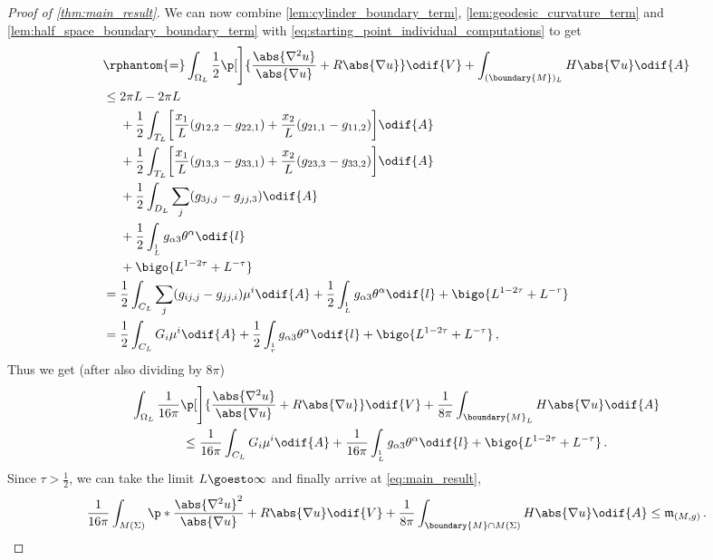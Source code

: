 \documentclass[titlepage,numbers=noenddot,oneside,%
cleardoublepage=empty,paper=a4,fontsize=11pt,%
english,%
]{scrartcl}
\newcommand*{\mathcomma}{\,,}
\newcommand*{\mathfullstop}{\,.}
\let\sphere\relax
\newcommand{\sphere}{\mathbb{S}}
\newcommand{\mass}[2]{\mathfrak{m}_{(#1,#2)}} %
\begin{document}
\begin{proof}[Proof of \cref{thm:main_result}]
    We can now combine \cref{lem:cylinder_boundary_term}, \cref{lem:geodesic_curvature_term} and \cref{lem:half_space_boundary_boundary_term} with \cref{eq:starting_point_individual_computations}
     to get
    \begin{equation*}
        \begin{aligned}[t]
            &\rphantom{=}\int_{\Omega_L} \frac{1}{2}\p[\Bigg]{\frac{\abs{\nabla^2 u}}{\abs{\nabla u}}+R\abs{\nabla u} }\odif{V}+\int_{(\boundary{M})_L} H\abs{\nabla u}\odif{A}\\
            & \leq \begin{aligned}[t]
                &2\pi L- 2\pi L\\
                &+\frac{1}{2}\int_{T_L}\biggl[\frac{x_1}{L}(g_{12,2}-g_{22,1})+\frac{x_2}{L}(g_{21,1}-g_{11,2})\biggr]\odif{A}\\
                &+\frac{1}{2}\int_{T_L}\biggl[\frac{x_1}{L}(g_{13,3}-g_{33,1})+\frac{x_2}{L}(g_{23,3}-g_{33,2})\biggr]\odif{A}\\
                &+\frac{1}{2}\int_{D_L}\sum_{j}(g_{3j,j}-g_{jj,3})\odif{A}\\
                &
                +\frac{1}{2}\int_{\sphere^1_L}g_{\alpha 3}\theta^\alpha\odif{l}\\
                &+\bigo{L^{1-2\tau}+L^{-\tau}}
            \end{aligned}\\
            &=\frac{1}{2}\int_{C_L}\sum_{j}(g_{ij,j}-g_{jj,i})\mu^i\odif{A}+\frac{1}{2}\int_{\sphere^1_L}g_{\alpha 3}\theta^\alpha\odif{l}+\bigo{L^{1-2\tau}+L^{-\tau}}\\
            &=\frac{1}{2}\int_{C_L}G_i\mu^i\odif{A}+\frac{1}{2}\int_{\sphere_r^{1}}g_{\alpha 3}\theta^\alpha\odif{l}+\bigo{L^{1-2\tau}+L^{-\tau}}\mathcomma
        \end{aligned}
    \end{equation*}
    Thus we get (after also dividing by \( 8\pi \))
    \begin{multline*}
        \int_{\Omega_L} \frac{1}{16\pi}\p[\Bigg]{\frac{\abs{\nabla^2 u}}{\abs{\nabla u}}+R \abs{\nabla u}}\odif{V}+\frac{1}{8\pi}\int_{\boundary{M}_L}H\abs{\nabla u}\odif{A}\\
        \leq \frac{1}{16\pi}\int_{C_L}G_i\mu^i\odif{A}+\frac{1}{16\pi}\int_{\sphere^1_L}g_{\alpha3}\theta^\alpha\odif{l}+\bigo{L^{1-2\tau}+L^{-\tau}}\mathfullstop
    \end{multline*}
    Since \( \tau>\frac{1}{2} \), we can take the limit \( L\goesto \infty \) and finally arrive at \cref{eq:main_result},
    \begin{equation}
        \frac{1}{16\pi}\int_{M(\Sigma)}\p*{\frac{\abs{\nabla^2 u}^2}{\abs{\nabla u}}+R\abs{\nabla u}}\odif{V}+\frac{1}{8\pi}\int_{\boundary{M}\cap M(\Sigma)}H \abs{\nabla u}\odif{A}\leq \mass{M}{g}\mathfullstop\label{eq:final_statement_main_result}
    \end{equation}
\end{proof}
\end{document}
